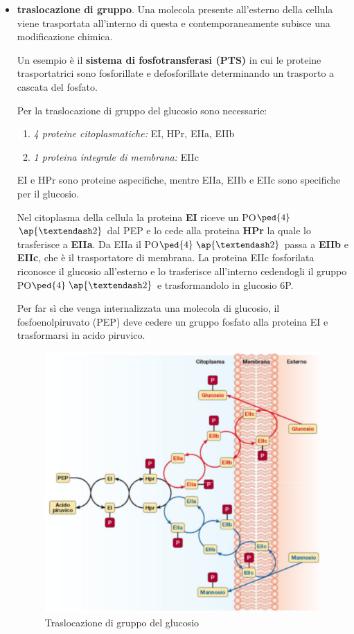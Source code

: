 \documentclass[11pt]{book}
\begin{document}
\begin{itemize}
\item \textbf{traslocazione di gruppo}. Una molecola presente all'esterno della cellula viene trasportata all’interno di questa e contemporaneamente subisce una modificazione chimica.

Un esempio è il \textbf{sistema di fosfotransferasi (PTS)} in cui le proteine trasportatrici sono fosforillate e defosforillate determinando un trasporto a cascata del fosfato.

Per la traslocazione di gruppo del glucosio sono necessarie:

\begin{enumerate}
\item \emph{4 proteine citoplasmatiche:} EI, HPr, EIIa, EIIb
\item \emph{1 proteina integrale di membrana:} EIIc
\end{enumerate}

EI e HPr sono proteine aspecifiche, mentre EIIa, EIIb e EIIc sono specifiche per il glucosio.

Nel citoplasma della cellula la proteina \textbf{EI} riceve un PO$\ped{4}$$\ap{–2}$ dal PEP e lo cede alla proteina \textbf{HPr} la quale lo trasferisce a \textbf{EIIa}. Da EIIa il PO$\ped{4}$$\ap{–2}$ passa a \textbf{EIIb} e \textbf{EIIc}, che è il trasportatore di membrana. La proteina EIIc fosforilata riconosce il glucosio all’esterno e lo trasferisce all’interno cedendogli il gruppo PO$\ped{4}$$\ap{–2}$ e trasformandolo in glucosio 6P. 

Per far sì che venga internalizzata una molecola di glucosio, il fosfoenolpiruvato (PEP)  deve cedere un gruppo fosfato alla proteina EI e trasformarsi in acido piruvico.

\clearpage
\begin{figure}[htp]
\centering
\includegraphics[scale=0.5]{img/Traslocazione di gruppo.png}
\caption{Traslocazione di gruppo del glucosio}
\label{}
\end{figure}

\end{itemize}
\end{document}
